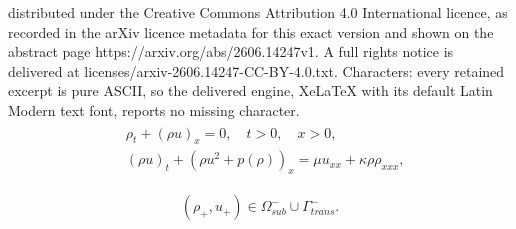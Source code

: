 \documentclass[10pt,a4paper]{amsart}
\begin{document}
distributed under the Creative Commons Attribution 4.0 International licence, as recorded in the arXiv licence metadata for this exact version and shown on the abstract page https://arxiv.org/abs/2606.14247v1. A full rights notice is delivered at licenses/arxiv-2606.14247-CC-BY-4.0.txt. Characters: every retained excerpt is pure ASCII, so the delivered engine, XeLaTeX with its default Latin Modern text font, reports no missing character.
\begin{align} \label{eq:NSK}
\begin{aligned}
    &\rho_t +(\rho u)_x=0, \quad t>0, \quad x>0, \\
    &(\rho u)_t +(\rho u^2+p(\rho))_x = \mu u_{xx} + \kappa \rho\rho_{xxx},
\end{aligned}
\end{align}

\begin{equation}\label{cond:U+}
(\rho_+, u_+) \in \Omega_{sub}^- \cup  \Gamma_{trans}^-.
\end{equation}
\end{document}
